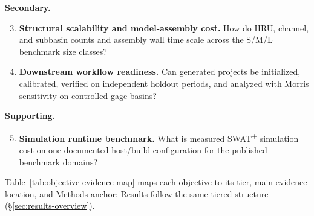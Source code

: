 \textbf{Secondary.}
\begin{enumerate}
  \setcounter{enumi}{2}
  \item \textbf{Structural scalability and model-assembly cost.} How do HRU, channel, and subbasin counts and assembly wall time scale across the S/M/L benchmark size classes?
  \item \textbf{Downstream workflow readiness.} Can generated projects be initialized, calibrated, verified on independent holdout periods, and analyzed with Morris sensitivity on controlled gage basins?
\end{enumerate}

\textbf{Supporting.}
\begin{enumerate}
  \setcounter{enumi}{4}
  \item \textbf{Simulation runtime benchmark.} What is measured SWAT\textsuperscript{+} simulation cost on one documented host/build configuration for the published benchmark domains?
\end{enumerate}

Table~\ref{tab:objective-evidence-map} maps each objective to its tier, main evidence location, and Methods anchor; Results follow the same tiered structure (\S\ref{sec:results-overview}).



